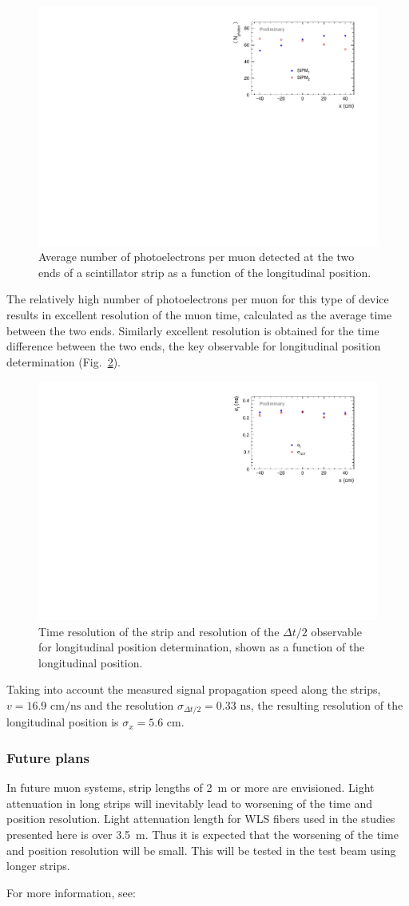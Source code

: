 \begin{figure}[h!]
\centering
   \includegraphics[width=.6\textwidth]{nphot}
   \caption{\label{fig:nphot} Average number of photoelectrons per muon detected at the two ends of a scintillator strip as a function of the longitudinal position.}
\end{figure}

The relatively high number of photoelectrons per muon for this type of device results in excellent resolution of the muon time, calculated as the average time between the two ends. Similarly excellent resolution is obtained for the time difference between the two ends, the key observable for longitudinal position determination (Fig.\ \ref{fig:sigma-tdt}).

\begin{figure}[h!]
\centering
   \includegraphics[width=.6\textwidth]{sigma-tdt}
   \caption{\label{fig:sigma-tdt} Time resolution of the strip and resolution of the $\Delta t/2$ observable for longitudinal position determination, shown as a function of the longitudinal position.}
\end{figure}

Taking into account the measured signal propagation speed along the strips, \mbox{$v=16.9\text{ cm/ns}$} and the resolution $\sigma_{\Delta t/2} = 0.33\text{ ns}$, the resulting resolution of the longitudinal position is $\sigma_x = 5.6\text{ cm}$.

\subsubsection{Future plans}

In future muon systems, strip lengths of 2~m or more are envisioned. Light attenuation in long strips will inevitably lead to worsening of the time and position resolution. Light attenuation length for WLS fibers used in the studies presented here is over 3.5~m. Thus it is expected that the worsening of the time and position resolution will be small. This will be tested in the test beam using longer strips.

For more information, see: \cite{Denisov2016120}
